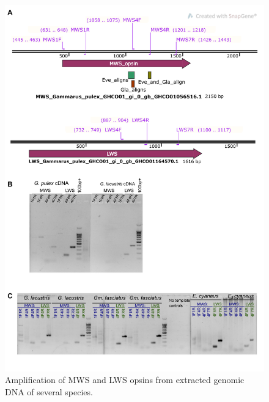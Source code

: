 \documentclass{article}
\begin{document}
\begin{figure}[H] 
	\includegraphics[scale=0.75]{./FigS3_gDNA_PCR_Gmfa_Ecy_Gla.png}
	\caption{Amplification of MWS and LWS opsins from extracted genomic DNA of several species.} \end{figure}
\end{document}
